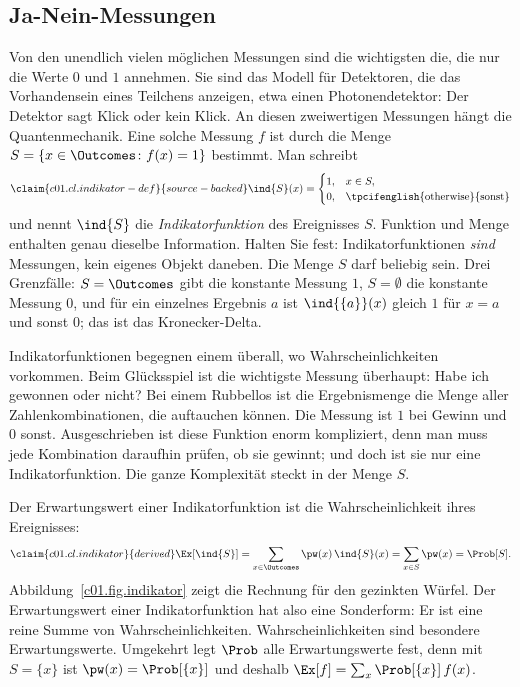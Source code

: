 \subsection{Ja-Nein-Messungen}\label{c01.s2.3}

Von den unendlich vielen möglichen Messungen sind die wichtigsten die, die nur die Werte $0$
und $1$ annehmen. Sie sind das Modell für Detektoren, die das Vorhandensein eines Teilchens
anzeigen, etwa einen Photonendetektor: Der Detektor sagt Klick oder kein Klick. An diesen
zweiwertigen Messungen hängt die Quantenmechanik.
Eine solche Messung $f$ ist durch die Menge $S = \{x \in \Outcomes \colon f(x) = 1\}$
bestimmt. Man schreibt
\begin{equation}\label{c01.eq.indikator-def}\claim{c01.cl.indikator-def}{source-backed}
  \ind{S}(x) =
  \begin{cases}
    1, & x \in S, \\
    0, & \text{\tpcifenglish{otherwise}{sonst}}
  \end{cases}
\end{equation}
und nennt $\ind{S}$ die \emph{Indikatorfunktion} des Ereignisses $S$. Funktion und Menge
enthalten genau dieselbe Information. Halten Sie fest: Indikatorfunktionen \emph{sind}
Messungen, kein eigenes Objekt daneben. Die Menge $S$ darf beliebig sein. Drei Grenzfälle:
$S = \Outcomes$ gibt die konstante Messung $1$, $S = \emptyset$ die konstante Messung $0$,
und für ein einzelnes Ergebnis $a$ ist $\ind{\{a\}}(x)$ gleich $1$ für $x = a$ und sonst
$0$; das ist das Kronecker-Delta.

\begin{remark}
  Indikatorfunktionen begegnen einem überall, wo Wahrscheinlichkeiten vorkommen. Beim
  Glücksspiel ist die wichtigste Messung überhaupt: Habe ich gewonnen oder nicht? Bei einem
  Rubbellos ist die Ergebnismenge die Menge aller Zahlenkombinationen, die auftauchen
  können. Die Messung ist $1$ bei Gewinn und $0$ sonst. Ausgeschrieben ist diese Funktion
  enorm kompliziert, denn man muss jede Kombination daraufhin prüfen, ob sie gewinnt; und
  doch ist sie nur eine Indikatorfunktion. Die ganze Komplexität steckt in der Menge $S$.
\end{remark}

Der Erwartungswert einer Indikatorfunktion ist die Wahrscheinlichkeit ihres Ereignisses:
\begin{equation}\label{c01.eq.indikator}\claim{c01.cl.indikator}{derived}
  \Ex[\ind{S}] = \sum_{x \in \Outcomes} \pw(x)\, \ind{S}(x) = \sum_{x \in S} \pw(x) = \Prob[S] .
\end{equation}
Abbildung~\ref{c01.fig.indikator} zeigt die Rechnung für den gezinkten Würfel. Der
Erwartungswert einer Indikatorfunktion hat also eine Sonderform: Er ist eine reine Summe von
Wahrscheinlichkeiten. Wahrscheinlichkeiten sind besondere Erwartungswerte. Umgekehrt legt $\Prob$ alle
Erwartungswerte fest, denn mit $S = \{x\}$ ist $\pw(x) = \Prob[\{x\}]$ und deshalb
$\Ex[f] = \sum_{x} \Prob[\{x\}]\, f(x)$.

